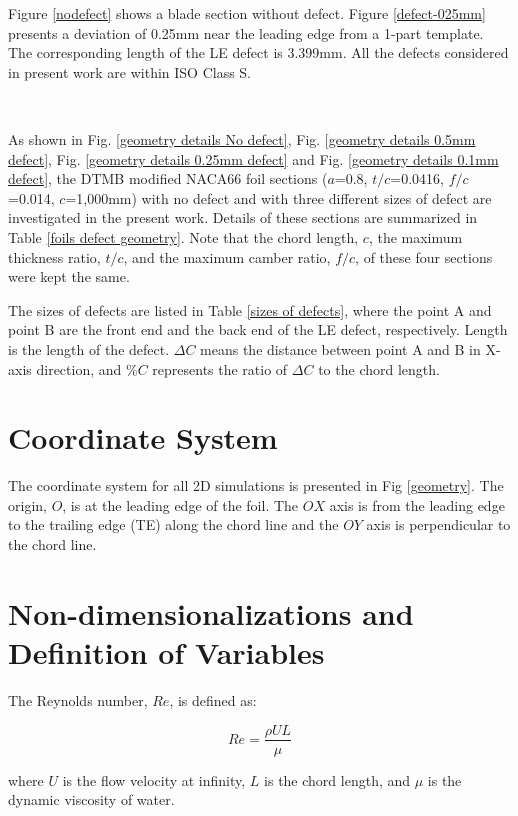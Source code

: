 \documentclass[onecolumn,11pt]{report}
\begin{document}
Figure \ref{nodefect} shows a blade section without defect. Figure \ref{defect-025mm} presents a deviation of 0.25mm near the leading edge from a 1-part template. The corresponding length of the LE defect is 3.399mm.  All the defects considered in present work are within ISO Class S. 

\

As shown in Fig. \ref{geometry details No defect}, Fig. \ref{geometry details 0.5mm defect}, Fig. \ref{geometry details 0.25mm defect} and Fig. \ref{geometry details 0.1mm defect}, the DTMB modified NACA66 foil sections ($a$=0.8, $t/c$=0.0416, $f/c$=0.014, $c$=1,000mm) with no defect and with three different sizes of defect are investigated in the present work. Details of these sections are summarized in Table   \ref{foils defect geometry}. Note that the chord length, $c$, the maximum thickness ratio, $t/c$, and the maximum camber ratio, $f/c$,  of these four sections were kept the same. 



The sizes of defects are listed in Table  \ref{sizes of defects}, where the point A and point B are the front end and the back end of the LE defect, respectively. Length is the length of the defect. $\Delta C$ means the distance between point A and B in X-axis direction, and $\% C$ represents the ratio of $\Delta C$ to the chord length.



\section{Coordinate System}

The coordinate system for all 2D simulations is presented in Fig \ref{geometry}. The origin, $O$, is at the leading edge of the foil. The $OX$ axis is from the leading edge to the trailing edge (TE) along the chord line and the $OY$ axis is perpendicular to the chord line.

\section{Non-dimensionalizations and Definition of Variables}

The Reynolds number, $Re$, is defined as:

\begin{equation}
Re = \frac{\rho U L}{\mu}
\label{eq19}
\end{equation}

where $U$ is the flow velocity at infinity, $L$ is the chord length, and $\mu$ is the dynamic viscosity of water. 
\end{document}
